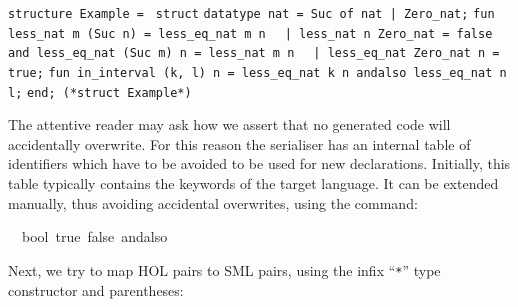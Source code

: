 \begin{isabellebody}
\begin{isamarkuptext}
\isaverbatim%
\noindent%
\verb|structure Example = |\newline%
\verb|struct|\newline%
\newline%
\verb|datatype nat = Suc of nat |\verb,|,\verb| Zero_nat;|\newline%
\newline%
\verb|fun less_nat m (Suc n) = less_eq_nat m n|\newline%
\verb|  |\verb,|,\verb| less_nat n Zero_nat = false|\newline%
\verb|and less_eq_nat (Suc m) n = less_nat m n|\newline%
\verb|  |\verb,|,\verb| less_eq_nat Zero_nat n = true;|\newline%
\newline%
\verb|fun in_interval (k, l) n = less_eq_nat k n andalso less_eq_nat n l;|\newline%
\newline%
\verb|end; (*struct Example*)|%
\end{isamarkuptext}%
\isamarkuptrue%
%
\endisatagquote
{\isafoldquote}%
%
\isadelimquote
%
\endisadelimquote
%
\begin{isamarkuptext}%
\noindent The attentive reader may ask how we assert that no generated
  code will accidentally overwrite.  For this reason the serialiser has
  an internal table of identifiers which have to be avoided to be used
  for new declarations.  Initially, this table typically contains the
  keywords of the target language.  It can be extended manually, thus avoiding
  accidental overwrites, using the \hyperlink{command.code-reserved}{\mbox{}} command:%
\end{isamarkuptext}%
\isamarkuptrue%
%
\isadelimquote
%
\endisadelimquote
%
\isatagquote
{}\isamarkupfalse%
\ {\isachardoublequoteopen}{\isasymSML}{\isachardoublequoteclose}\ bool\ true\ false\ andalso%
\endisatagquote
{\isafoldquote}%
%
\isadelimquote
%
\endisadelimquote
%
\begin{isamarkuptext}%
\noindent Next, we try to map HOL pairs to SML pairs, using the
  infix ``\verb|*|'' type constructor and parentheses:%
\end{isamarkuptext}%
\isamarkuptrue%
%
\isadeliminvisible
%
\endisadeliminvisible
%
\isataginvisible
%
\endisataginvisible
{\isafoldinvisible}%
%
\isadeliminvisible
%
\endisadeliminvisible
%
\isadelimquotett
%
\endisadelimquotett
%
\isatagquotett
{}\isamarkupfalse%

\end{isabellebody}
